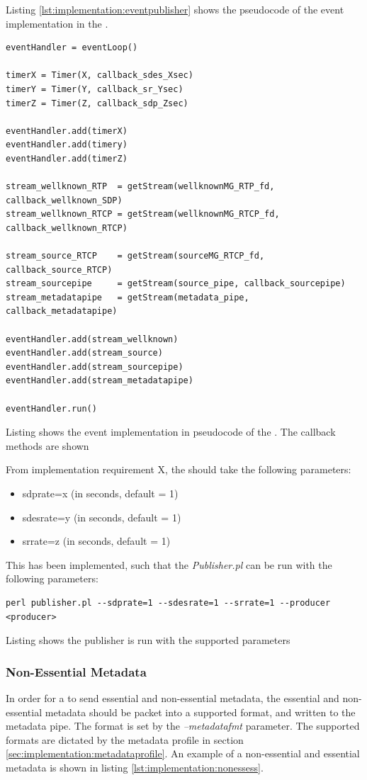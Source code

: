 Listing \ref{lst:implementation:eventpublisher} shows the pseudocode of the event implementation in the \pub{}.
\begin{listing}[H] 
\begin{verbatim}
eventHandler = eventLoop()
	
timerX = Timer(X, callback_sdes_Xsec)
timerY = Timer(Y, callback_sr_Ysec)
timerZ = Timer(Z, callback_sdp_Zsec)
	
eventHandler.add(timerX)
eventHandler.add(timery)
eventHandler.add(timerZ)
	
stream_wellknown_RTP  = getStream(wellknownMG_RTP_fd, callback_wellknown_SDP)
stream_wellknown_RTCP = getStream(wellknownMG_RTCP_fd, callback_wellknown_RTCP)

stream_source_RTCP    = getStream(sourceMG_RTCP_fd, callback_source_RTCP)
stream_sourcepipe     = getStream(source_pipe, callback_sourcepipe)
stream_metadatapipe   = getStream(metadata_pipe, callback_metadatapipe)	
	
eventHandler.add(stream_wellknown)
eventHandler.add(stream_source)
eventHandler.add(stream_sourcepipe)
eventHandler.add(stream_metadatapipe)
	
eventHandler.run()
\end{verbatim}
\caption{Listing shows the event implementation in pseudocode of the \pub{}. The callback methods are shown}
\label{lst:implementation:eventpublisher}
\end{listing}

From implementation requirement X, the \pub{} should take the following parameters:
\begin{itemize}
	\item sdprate=x (in seconds, default = 1)
	\item sdesrate=y (in seconds, default = 1)
	\item srrate=z (in seconds, default = 1)
\end{itemize}

This has been implemented, such that the \textit{Publisher.pl} can be run with the following parameters:
\begin{listing}[h] 
\begin{verbatim}
perl publisher.pl --sdprate=1 --sdesrate=1 --srrate=1 --producer <producer>
\end{verbatim}
\caption{Listing shows the publisher is run with the supported parameters}
\label{lst:implementation:parameterspublisher}
\end{listing}

\subsubsection{Non-Essential Metadata} \label{sec:implementation:events:pub}
In order for a \pro{} to send essential and non-essential metadata, the essential and non-essential metadata should be packet into a supported format, and written to the metadata pipe. The format is set by the \textit{--metadatafmt} parameter. The supported formats are dictated by the metadata profile in section \ref{sec:implementation:metadataprofile}. An example of a non-essential and essential metadata is shown in listing \ref{lst:implementation:nonessess}.

